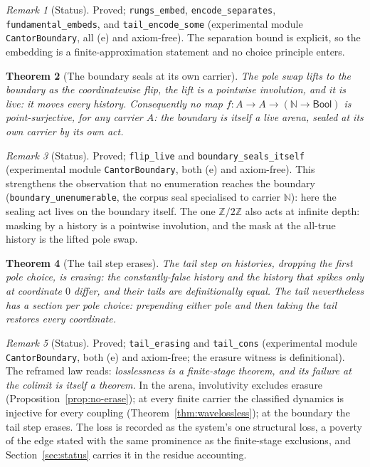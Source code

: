 \documentclass[11pt,a4paper]{article}
\theoremstyle{plain}
\newtheorem{theorem}{Theorem}[section]
\theoremstyle{definition}
\theoremstyle{remark}
\newtheorem{remark}[theorem]{Remark}
\newcommand{\Bool}{\mathsf{Bool}}
\newcommand{\Ztwo}{\mathbb{Z}/2\mathbb{Z}}
\begin{document}
\begin{remark}[Status]
Proved; \texttt{rungs\_embed}, \texttt{encode\_separates},
\texttt{fundamental\_embeds}, and \texttt{tail\_encode\_some}
(experimental module \texttt{CantorBoundary}, all (e) and
axiom-free). The separation
bound is explicit, so the embedding is a finite-approximation
statement and no choice principle enters.
\end{remark}

\begin{theorem}[The boundary seals at its own carrier]
\label{thm:boundaryseal}
The pole swap lifts to the boundary as the coordinatewise flip, the
lift is a pointwise involution, and it is live: it moves every
history. Consequently no map $f:A\to A\to(\mathbb{N}\to\Bool)$ is
point-surjective, for any carrier $A$: the boundary is itself a live
arena, sealed at its own carrier by its own act.
\end{theorem}

\begin{remark}[Status]
Proved; \texttt{flip\_live} and \texttt{boundary\_seals\_itself}
(experimental module \texttt{CantorBoundary}, both (e) and
axiom-free). This
strengthens the observation that no enumeration reaches the boundary
(\texttt{boundary\_unenumerable}, the corpus seal specialised to
carrier $\mathbb{N}$): here the sealing act lives on the boundary
itself. The one $\Ztwo$ also acts at infinite depth: masking by a
history is a pointwise involution, and the mask at the all-true
history is the lifted pole swap.
\end{remark}

\begin{theorem}[The tail step erases]
\label{thm:tailerase}
The tail step on histories, dropping the first pole choice, is
erasing: the constantly-false history and the history that spikes only
at coordinate $0$ differ, and their tails are definitionally equal.
The tail nevertheless has a section per pole choice: prepending either
pole and then taking the tail restores every coordinate.
\end{theorem}

\begin{remark}[Status]
Proved; \texttt{tail\_erasing} and \texttt{tail\_cons}
(experimental module \texttt{CantorBoundary}, both (e) and
axiom-free; the erasure witness is definitional). The reframed law reads: \emph{losslessness is a
finite-stage theorem, and its failure at the colimit is itself a
theorem.} In the arena, involutivity excludes erasure
(Proposition~\ref{prop:no-erase}); at every finite carrier the
classified dynamics is injective for every coupling
(Theorem~\ref{thm:wavelossless}); at the boundary the tail step
erases. The loss is recorded as the system's one structural loss, a
poverty of the edge stated with the same prominence as the finite-stage
exclusions, and Section~\ref{sec:status} carries it in the residue
accounting.
\end{remark}
\end{document}

